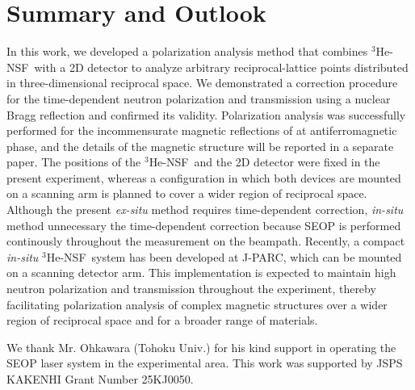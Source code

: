 \documentclass[%
 reprint,
superscriptaddress,
 amsmath,amssymb,
 aps,
floatfix,
]{revtex4-2}
\newcommand{\Hensf}{$^3$He-NSF}
\begin{document}
\section{Summary and Outlook}
In this work, we developed a polarization analysis method that combines \Hensf~with a 2D detector to analyze arbitrary reciprocal-lattice points distributed in three-dimensional reciprocal space.
We demonstrated a correction procedure for the time-dependent neutron polarization and transmission using a nuclear Bragg reflection and confirmed its validity.
Polarization analysis was successfully performed for the incommensurate magnetic reflections of  at antiferromagnetic phase, and the details of the magnetic structure will be reported in a separate paper.
The positions of the \Hensf~and the 2D detector were fixed in the present experiment, whereas a configuration in which both devices are mounted on a scanning arm is planned to cover a wider region of reciprocal space.
Although the present \textit{ex-situ} method requires time-dependent correction, \textit{in-situ} method unnecessary the time-dependent correction because SEOP is performed continously throughout the measurement on the beampath.
Recently, a compact \textit{in-situ} \Hensf~system has been developed at J-PARC, which can be mounted on a scanning detector arm\cite{takahashi_development_2025}.
This implementation is expected to maintain high neutron polarization and transmission throughout the experiment, thereby facilitating polarization analysis of complex magnetic structures over a wider region of reciprocal space and for a broader range of materials.

\begin{acknowledgments}
We thank Mr. Ohkawara (Tohoku Univ.) for his kind support in operating the SEOP laser system in the experimental area.
This work was supported by JSPS KAKENHI Grant Number 25KJ0050.
\end{acknowledgments}

\appendix
\end{document}
